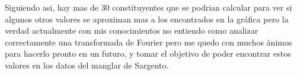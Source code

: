 \documentclass{article}
\begin{document}
Siguiendo asi, hay mas de 30 constituyentes que se podrian calcular para ver si algunos otros valores se aproximan mas a los encontrados en la gráfica pero la verdad actualmente con mis conocimientos no entiendo como analizar correctamente una transformada de Fourier pero me quedo con muchos ánimos para hacerlo pronto en un futuro, y tomar el objetivo de poder encontrar estos valores en los datos del manglar de Sargento.
\end{document}

